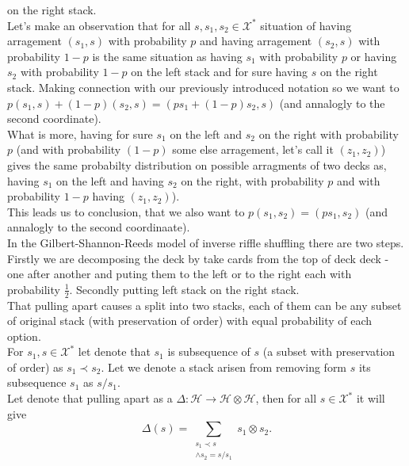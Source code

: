 \documentclass[a4paper, 12pt]{report}
\begin{document}
on the right stack. \\ 
Let's make an observation that for all $s, s_1, s_2 \in \mathcal{X}^*$ situation of having arragement 
$(s_1, s)$ with probability $p$ and having arragement $(s_2, s)$ with probability $1-p$ is 
the same situation as having $s_1$ with probability $p$ or having $s_2$ with probability $1 - p$ on the left 
stack and for sure having $s$ on the right stack. Making connection with our previously introduced notation 
so we want to $p(s_1, s) + (1-p)(s_2, s) = (ps_1 + (1-p)s_2, s)$ (and annalogly to the second coordinate).\\
What is more, having for sure $s_1$ on the left and $s_2$ on the right with probability $p$ (and 
with probability $(1 - p)$ some else arragement, let's call it $(z_1, z_2)$) gives the same probabilty 
distribution 
on possible arragments of two decks as, having $s_1$ on the left and having $s_2$ on the 
right, with probability $p$ and with probability $1-p$ having $(z_1,z_2)$).\\
This leads us to conclusion, that we also want to $p(s_1,s_2) = (ps_1, s_2)$ (and annalogly to the second 
coordinaate). \\
In the Gilbert-Shannon-Reeds model of inverse riffle shuffling there are two steps. Firstly we are 
decomposing the deck by take cards from the top of deck deck - one after another and puting them to the left 
or to the right each with probability $\frac{1}{2}$. Secondly putting left stack on the right stack. \\
That pulling apart causes a split into two stacks, each of them can be any subset of original stack 
(with preservation of order) with equal probability of each option. \\
For $s_1, s \in \mathcal{X}^*$ let denote that $s_1$ is subsequence of $s$ (a subset with preservation of 
order) as $s_1 \prec s_2$. Let we denote a stack arisen from removing form $s$ its subsequence $s_1$ as 
$s/s_1$. \\
Let denote that pulling apart as a $\Delta : \mathcal{H} \to \mathcal{H} \otimes \mathcal{H}$, then for all 
$s \in \mathcal{X}^*$ it will give
\begin{equation*}
\Delta(s) = \sum_{\substack{s_1 \prec s \\ \land s_2 = s/s_1}}
s_1 \otimes s_2.
\end{equation*}
\end{document}
